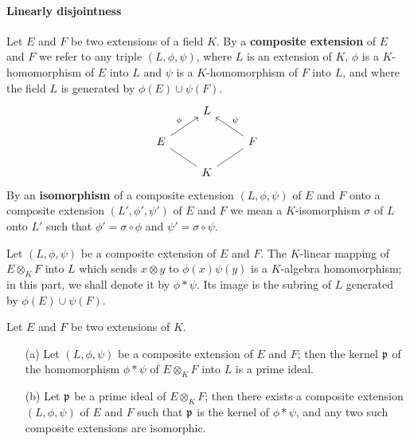 \paragraph{Linearly disjointness}
Let $E$ and $F$ be two extensions of a field $K$. By a \textbf{composite extension} of $E$ and $F$ we refer to any triple $(L,\phi,\psi)$, where $L$ is an extension of $K$, $\phi$ is a $K$-homomorphism of $E$ into $L$ and $\psi$ is a $K$-homomorphism of $F$ into $L$, and where the field $L$ is generated by $\phi(E)\cup\psi(F)$.
\[\begin{tikzcd}[row sep=scriptsize]
&L&\\
E\ar[ru,"\phi"]&&F\ar[lu,swap,"\psi"]\\
&K\ar[ru,no head]\ar[lu,no head]&
\end{tikzcd}\]
By an \textbf{isomorphism} of a composite extension $(L,\phi,\psi)$ of $E$ and $F$ onto a composite extension $(L',\phi',\psi')$ of $E$ and $F$ we mean a $K$-isomorphism $\sigma$ of $L$ onto $L'$ such that $\phi'=\sigma\circ\phi$ and $\psi'=\sigma\circ\psi$.\par
Let $(L,\phi,\psi)$ be a composite extension of $E$ and $F$. The $K$-linear mapping of $E\otimes_KF$ into $L$ which sends $x\otimes y$ to $\phi(x)\psi(y)$ is a $K$-algebra homomorphism; in this part, we shall denote it by $\phi\ast\psi$. Its image is the subring of $L$ generated by $\phi(E)\cup\psi(F)$.
\begin{proposition}\label{composite extension char}
Let $E$ and $F$ be two extensions of $K$.
\begin{itemize}
\item[(a)] Let $(L,\phi,\psi)$ be a composite extension of $E$ and $F$; then the kernel $\mathfrak{p}$ of the homomorphism $\phi\ast\psi$ of $E\otimes_KF$ into $L$ is a prime ideal.
\item[(b)] Let $\mathfrak{p}$ be a prime ideal of $E\otimes_KF$; then there exists a composite extension $(L,\phi,\psi)$ of $E$ and $F$ such that $\mathfrak{p}$ is the kernel of $\phi\ast\psi$, and any two such composite extensions are isomorphic.
\end{itemize}
\end{proposition}
